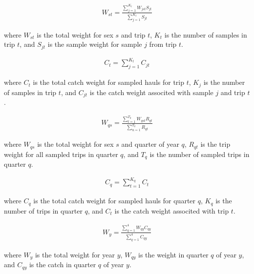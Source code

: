 \begin{align} \label{eq:totaltripwt}
W_{st}=\frac{\sum\limits_{j=1}^{K_t}W_{jst}S_{jt}}{\sum\limits_{j=1}^{K_t}S_{jt}}
\end{align}
\begin{addmargin}[3em]{1em}
where $W_{st}$ is the total weight for sex $s$ and trip $t$, $K_t$ is the number of samples in trip $t$, and $S_{jt}$ is the sample weight for sample $j$ from trip $t$.
\end{addmargin}

\begin{align} \label{eq:totaltripcatchwt}
C_t=\sum\limits_{j=1}^{K_t}C_{jt}
\end{align}
\begin{addmargin}[3em]{1em}
where $C_t$ is the total catch weight for sampled hauls for trip $t$, $K_j$ is the number of samples in trip $t$, and $C_{jt}$ is the catch weight associted with sample $j$ and trip $t$.
\end{addmargin}

\begin{align} \label{eq:totalquarterwt}
W_{qs}=\frac{\sum\limits_{t=1}^{T_q}W_{qst}R_{qt}}{\sum\limits_{n=1}^{T_q}R_{qt}}
\end{align}
\begin{addmargin}[3em]{1em}
where $W_{qs}$ is the total weight for sex $s$ and quarter of year $q$, $R_{qt}$ is the trip weight for all sampled trips in quarter $q$,
and $T_q$ is the number of sampled trips in quarter $q$.
\end{addmargin}

\begin{align} \label{eq:totalquartercatchwt}
C_q=\sum\limits_{t=1}^{K_q}C_{t}
\end{align}
\begin{addmargin}[3em]{1em}
where $C_q$ is the total catch weight for sampled hauls for quarter $q$, $K_q$ is the number of trips in quarter $q$, and $C_t$ is the catch weight associted with trip $t$.
\end{addmargin}

\begin{align} \label{eq:totalyearwt}
W_y=\frac{\sum\limits_{q=1}^{4}W_{qy}C_{qy}}{\sum\limits_{q=1}^{4}C_{qy}}
\end{align}
\begin{addmargin}[3em]{1em}
where $W_y$ is the total weight for year $y$, $W_{qy}$ is the weight in quarter $q$ of year $y$, and $C_{qy}$ is the catch in quarter $q$ of year $y$.
\end{addmargin}

